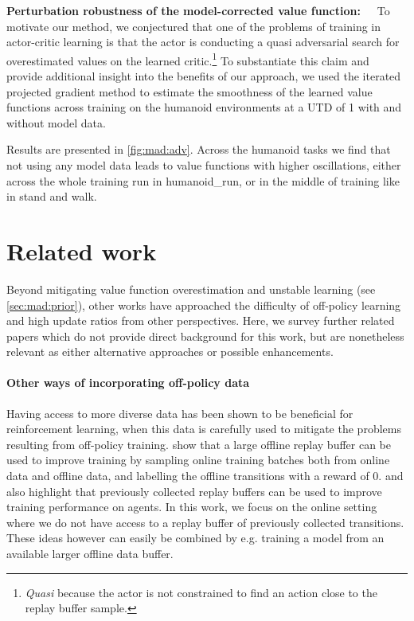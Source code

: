 \textbf{Perturbation robustness of the model-corrected value function:}~~~To motivate our method, we conjectured that one of the problems of training in actor-critic learning is that the actor is conducting a quasi adversarial search for overestimated values on the learned critic.\footnote{\emph{Quasi} because the actor is not constrained to find an action close to the replay buffer sample.}
To substantiate this claim and provide additional insight into the benefits of our approach, we used the iterated projected gradient method \textcite{madry2018towards} to estimate the smoothness of the learned value functions across training on the humanoid environments at a UTD of 1 with and without model data.

Results are presented in \autoref{fig:mad:adv}.
Across the humanoid tasks we find that not using any model data leads to value functions with higher oscillations, either across the whole training run in \textsf{\small humanoid\_run}, or in the middle of training like in \textsf{\small stand} and \textsf{\small walk}.


\section{Related work}

Beyond mitigating value function overestimation and unstable learning (see \autoref{sec:mad:prior}), other works have approached the difficulty of off-policy learning and high update ratios from other perspectives.
Here, we survey further related papers which do not provide direct background for this work, but are nonetheless relevant as either alternative approaches or possible enhancements.

\paragraph{Other ways of incorporating off-policy data} Having access to more diverse data has been shown to be beneficial for reinforcement learning, when this data is carefully used to mitigate the problems resulting from off-policy training.
\textcite{ball2023efficient} show that a large offline replay buffer can be used to improve training by sampling online training batches both from online data and offline data, and labelling the offline transitions with a reward of 0.
\textcite{agarwal2022reincarnating} and \textcite{tirumala2024replay} also highlight that previously collected replay buffers can be used to improve training performance on agents.
In this work, we focus on the online setting where we do not have access to a replay buffer of previously collected transitions.
These ideas however can easily be combined by e.g. training a model from an available larger offline data buffer.

